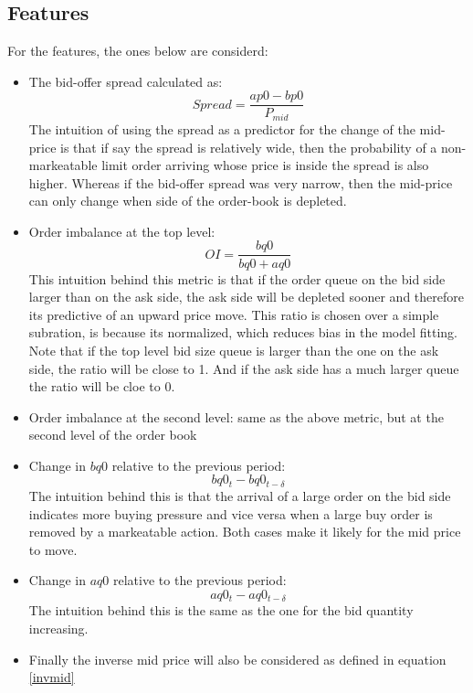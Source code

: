 \documentclass[english, 11pt, a4paper]{article}
\begin{document}
\subsection{Features}
For the features, the ones below are considerd:
\begin{itemize}
    \item The bid-offer spread calculated as:
        \begin{equation}
            Spread = \frac{ap0 - bp0}{P_{mid}}
        \end{equation}
    The intuition of using the spread as a predictor for the change of the mid-price is that if say
    the spread is relatively wide, then the probability of a non-markeatable limit order
    arriving whose price is inside the spread is also higher. Whereas if the bid-offer spread was very
    narrow, then the mid-price can only change when side of the order-book is depleted.
    \item Order imbalance at the top level: 
        \begin{equation}
            OI = \frac{bq0}{bq0+aq0} 
        \end{equation}
    This intuition behind this metric is that if the order queue on the bid side larger than on the
    ask side, the ask side will be depleted sooner and therefore its predictive of an upward
    price move. This ratio is chosen over a simple subration, is because its normalized, which
    reduces bias in the model fitting. Note that if the top level bid size queue is larger than the
        one on the ask side, the ratio will be close to 1. And if the ask side has a much larger
        queue the ratio will be cloe to 0.
    \item Order imbalance at the second level: same as the above metric, but at the second level of
        the order book
    \item Change in $bq0$ relative to the previous period:
        \begin{equation}
            bq0_{t} - bq0_{t-\delta} 
        \end{equation}
        The intuition behind this is that the arrival of a large order on the bid side indicates
        more buying pressure and vice versa when a large buy order is removed by a markeatable
        action. Both cases make it likely for the mid price to move.
    \item Change in $aq0$ relative to the previous period:
        \begin{equation}
            aq0_{t} - aq0_{t-\delta} 
        \end{equation}
        The intuition behind this is the same as the one for the bid quantity increasing.
    \item Finally the inverse mid price will also be considered as defined in equation \ref{invmid}
\end{itemize}
\end{document}
